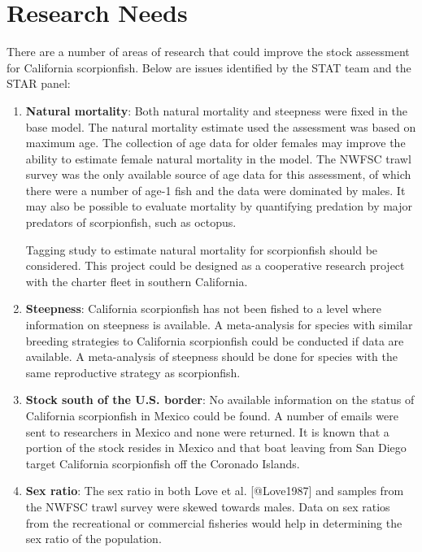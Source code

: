 \documentclass[12pt,]{article}
\begin{document}
\section{Research Needs}\label{research-needs}

There are a number of areas of research that could improve the stock
assessment for California scorpionfish. Below are issues identified by
the STAT team and the STAR panel:

\begin{enumerate}

\item \textbf{Natural mortality}: Both natural mortality and steepness were 
fixed in the base model.  The natural mortality estimate used the assessment 
was based on maximum age. The collection of age data for older females may improve 
the ability to estimate female natural mortality in the model.  The NWFSC trawl survey
was the only available source of age data for this assessment, of which there were a 
number of age-1 fish and the data were dominated by males.  It may also be possible 
to evaluate mortality by quantifying predation by major predators of scorpionfish, 
such as octopus. 

Tagging study to estimate natural mortality for scorpionfish should be 
considered.  This project could be designed as a cooperative research project 
with the charter fleet in southern California.

\item \textbf{Steepness}: California scorpionfish has not been fished to a level 
where information on steepness is available.  A meta-analysis for species 
with similar breeding strategies to California scorpionfish could be conducted if data are available.  A meta-analysis of steepness should be done for species with the same reproductive strategy as scorpionfish.


\item \textbf{Stock south of the U.S. border}:  No available information on the status of California scorpionfish in Mexico could be found.  A number of emails were sent to researchers 
in Mexico and none were returned.  It is known that a portion of the stock resides 
in Mexico and that boat leaving from San Diego target California scorpionfish off 
the Coronado Islands.  

\item \textbf{Sex ratio}:  The sex ratio in both Love et al. [@Love1987] and samples 
from the NWFSC trawl survey were skewed towards males. Data on sex ratios from the 
recreational or commercial fisheries would help in determining the sex ratio of the population.



\end{enumerate}
\end{document}
